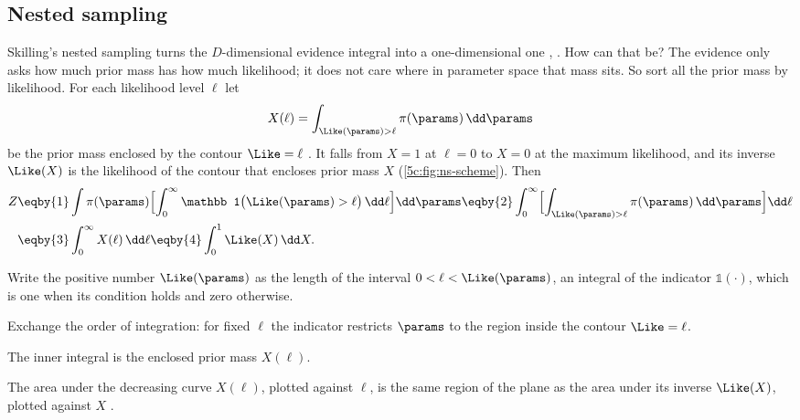 \subsection{Nested sampling}
\label{5c:sec:nested-sampling}

Skilling's nested sampling turns the $D$-dimensional evidence integral into a
one-dimensional one \cite{Skilling2006}, . How can that be?
The evidence only asks how much prior mass has how much likelihood; it does not care
where in parameter space that mass sits. So sort all the prior mass by likelihood. For
each likelihood level $\ell$ let
\[
  X(\ell)=\int_{\Like(\params)>\ell}\pi(\params)\,\dd\params
\]
be the prior mass enclosed by the contour $\Like=\ell$ . It
falls from $X=1$ at $\ell=0$ to $X=0$ at the maximum likelihood, and its inverse
$\Like(X)$ is the likelihood of the contour that encloses prior mass $X$
(\cref{5c:fig:ns-scheme}). Then
\begin{align}
  Z
  &\eqby{1}\int\pi(\params)\Bigl[\int_0^{\infty}\mathbb 1\bigl(\Like(\params)>\ell\bigr)\,\dd\ell\Bigr]\dd\params
   \eqby{2}\int_0^\infty\Bigl[\int_{\Like(\params)>\ell}\pi(\params)\,\dd\params\Bigr]\dd\ell
   \nonumber\\
  &\eqby{3}\int_0^\infty X(\ell)\,\dd\ell
   \eqby{4}\int_0^1\Like(X)\,\dd X .
  \label{5c:eq:ns}
\end{align}
\begin{explain}
  \item Write the positive number $\Like(\params)$ as the length of the interval
        $0<\ell<\Like(\params)$, an integral of the indicator $\mathbb1(\cdot)$, which is
        one when its condition holds and zero otherwise.
  \item Exchange the order of integration: for fixed $\ell$ the indicator restricts
        $\params$ to the region inside the contour $\Like=\ell$.
  \item The inner integral is the enclosed prior mass $X(\ell)$.
  \item The area under the decreasing curve $X(\ell)$, plotted against $\ell$, is the
        same region of the plane as the area under its inverse $\Like(X)$, plotted
        against $X$ .
\end{explain}

